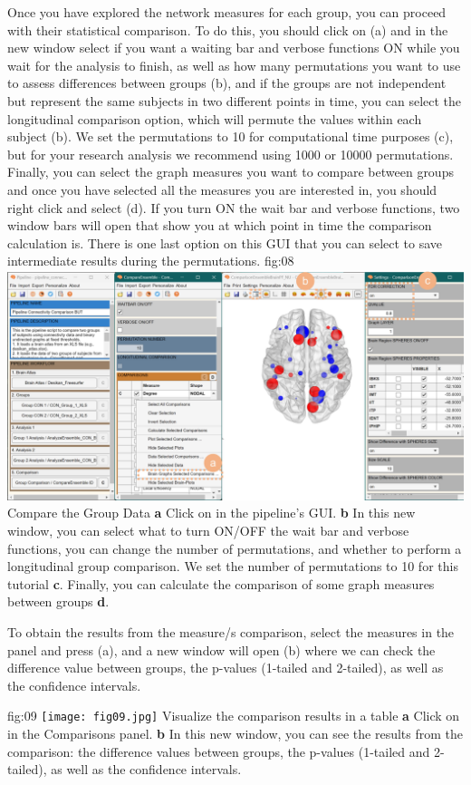 \documentclass[justified]{tufte-handout}
\begin{document}
Once you have explored the network measures for each group, you can proceed with their statistical comparison. To do this, you should click on  (a) and in the new window select if you want a waiting bar and verbose functions ON while you wait for the analysis to finish, as well as how many permutations you want to use to assess differences between groups ({b}), and if the groups are not independent but represent the same subjects in two different points in time, you can select the longitudinal comparison option, which will permute the values within each subject ({b}). We set the permutations to 10 for computational time purposes ({c}), but for your research analysis we recommend using 1000 or 10000 permutations. Finally, you can select the graph measures you want to compare between groups and once you have selected all the measures you are interested in, you should right click and select  ({d}). If you turn ON the wait bar and verbose functions, two window bars will open that show you at which point in time the comparison calculation is. There is one last option on this GUI that you can select to save intermediate results during the permutations.
	{fig:08}
	{
	\includegraphics{fig08.jpg}
	}
	{Compare the Group Data}
	{
	{\bf a} Click on  in the pipeline's GUI.
	{\bf b} In this new window, you can select what to turn ON/OFF the wait bar and verbose functions, you can change the number of permutations, and whether to perform a longitudinal group comparison. We set the number of permutations to 10 for this tutorial {\bf c}. Finally, you can calculate the comparison of some graph measures between groups {\bf d}.
	}
 
To obtain the results from the measure/s comparison, select the measures in the  panel and press ({a}), and a new window will open ({b}) where we can check the difference value between groups, the p-values (1-tailed and 2-tailed), as well as the confidence intervals.

	{fig:09}
	{
	\texttt{[image: fig09.jpg]}
	}
	{Visualize the comparison results in a table}
	{
	{\bf a} Click on  in the Comparisons panel.
	{\bf b} In this new window, you can see the results from the comparison: the difference values between groups, the p-values (1-tailed and 2-tailed), as well as the confidence intervals.
	}
\end{document}
